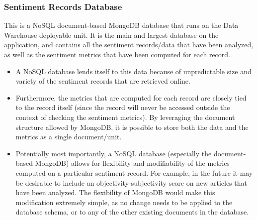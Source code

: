 \documentclass[12pt]{article}
\begin{document}
\subsubsection{Sentiment Records Database}
This is a NoSQL document-based MongoDB database that runs on the Data Warehouse deployable unit. It is the main and largest database on the application, and contains all the sentiment records/data that have been analyzed, as well as the sentiment metrics that have been computed for each record.
\begin{itemize}
    \item A NoSQL database lends itself to this data because of unpredictable size and variety of the sentiment records that are retrieved online.
    \item Furthermore, the metrics that are computed for each record are closely tied to the record itself (since the record will never be accessed outside the context of checking the sentiment metrics). By leveraging the document structure allowed by MongoDB, it is possible to store both the data and the metrics as a single document/unit.
    \item Potentially most importantly, a NoSQL database (especially the document-based MongoDB) allows for flexibility and modifiability of the metrics computed on a particular sentiment record. For example, in the future it may be desirable to include an objectivity-subjectivity score on new articles that have been analyzed. The flexibility of MongoDB would make this modification extremely simple, as no change needs to be applied to the database schema, or to any of the other existing documents in the database.
\end{itemize}
\end{document}
